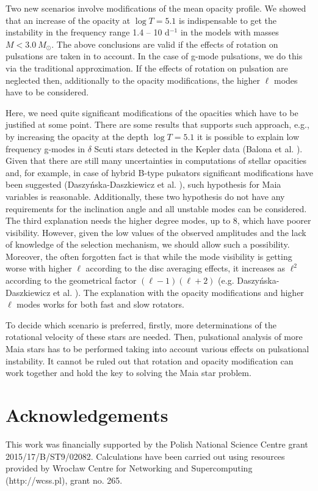 \documentclass[epj,twocolumn]{webofc}
\begin{document}
Two new scenarios involve modifications of the mean opacity profile. We showed that an increase of the opacity at $\log T=5.1$ is indispensable
to get the instability in the frequency range 1.4 – 10 d$^{-1}$ in the models with masses $M<3.0~M_\odot$.
The above conclusions are valid if the effects of rotation on pulsations are taken in to account.
In the case of g-mode pulsations, we do this via the traditional approximation.
If the effects of rotation on pulsation are neglected then, additionally to the opacity modifications, the higher $\ell$ modes have to be considered.

Here, we need quite significant modifications of the opacities which have to be justified at some point.
There are some results that supports such approach, e.g., by increasing the opacity at the depth $\log T=5.1$
it is possible to explain low frequency g-modes in $\delta$ Scuti stars detected in the Kepler data (Balona et al. \citep{2015MNRAS.452.3073B}).
Given that there are still many uncertainties in computations of stellar opacities and, for example, in case of hybrid B-type pulsators
significant modifications have been suggested (Daszy\'nska-Daszkiewicz et al. \citep{JDD_PW2016}), such hypothesis for Maia variables is reasonable.
Additionally, these two hypothesis do not have any requirements for the inclination angle and all unstable modes can be considered.
The third explanation needs the higher degree modes, up to 8, which have poorer visibility. However, given the low values of the observed amplitudes
and the lack of knowledge of the selection mechanism, we should allow such a possibility.
Moreover, the often forgotten fact is that while the mode visibility is getting worse with higher $\ell$ according to the disc averaging effects, it increases as $\ell^2$
according to the geometrical factor $(\ell-1)(\ell+2)$ (e.g. Daszy\'nska-Daszkiewicz et al. \citep{2002A&A...392..151D}).
The explanation with the opacity modifications and higher $\ell$ modes works for both fast and slow rotators.

To decide which scenario is preferred, firstly, more determinations of the rotational velocity of these stars are needed.
Then, pulsational analysis of more Maia stars has to be performed taking into account various effects on pulsational instability.
It cannot be ruled out that rotation and opacity modification can work together and hold the key to solving the Maia star problem.



\section*{Acknowledgements}
This work was financially supported by the Polish National Science Centre grant 2015/17/B/ST9/02082.
Calculations have been carried out using
resources provided by Wroc{\l}aw Centre for Networking and Supercomputing (http://wcss.pl), grant no. 265.\\
\end{document}
